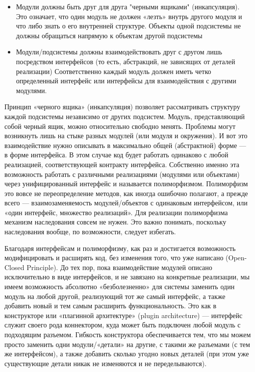 \documentclass[a4paper]{article}
\begin{document}
\begin{itemize}
\item Модули должны быть друг для друга "черными ящиками" (инкапсуляция). Это означает, что один модуль не должен «лезть» внутрь другого модуля и что либо знать о его внутренней структуре. Объекты одной подсистемы не должны обращаться напрямую к объектам другой подсистемы
\item Модули/подсистемы должны взаимодействовать друг с другом лишь посредством интерфейсов (то есть, абстракций, не зависящих от деталей реализации) Соответственно каждый модуль должен иметь четко определенный интерфейс или интерфейсы для взаимодействия с другими модулями.
\end{itemize}

Принцип «черного ящика» (инкапсуляция) позволяет рассматривать структуру каждой подсистемы независимо от других подсистем. Модуль, представляющий собой черный ящик, можно относительно свободно менять. Проблемы могут возникнуть лишь на стыке разных модулей (или модуля и окружения). И вот это взаимодействие нужно описывать в максимально общей (абстрактной) форме — в форме интерфейса. В этом случае код будет работать одинаково с любой реализацией, соответствующей контракту интерфейса. Собственно именно эта возможность работать с различными реализациями (модулями или объектами) через унифицированный интерфейс и называется полиморфизмом. Полиморфизм это вовсе не переопределение методов, как иногда ошибочно полагают, а прежде всего — взаимозаменяемость модулей/объектов с одинаковым интерфейсом, или «один интерфейс, множество реализаций». Для реализации полиморфизма механизм наследования совсем не нужен. Это важно понимать, поскольку наследования вообще, по возможности, следует избегать.

Благодаря интерфейсам и полиморфизму, как раз и достигается возможность модифицировать и расширять код, без изменения того, что уже написано (Open-Closed Principle). До тех пор, пока взаимодействие модулей описано исключительно в виде интерфейсов, и не завязано на конкретные реализации, мы имеем возможность абсолютно «безболезненно» для системы заменить один модуль на любой другой, реализующий тот же самый интерфейс, а также добавить новый и тем самым расширить функциональность. Это как в конструкторе или «плагинной архитектуре» (plugin architecture) — интерфейс служит своего рода коннектором, куда может быть подключен любой модуль с подходящим разъемом. Гибкость конструктора обеспечивается тем, что мы можем просто заменить одни модули/«детали» на другие, с такими же разъемами (с тем же интерфейсом), а также добавить сколько угодно новых деталей (при этом уже существующие детали никак не изменяются и не переделываются).
\end{document}
